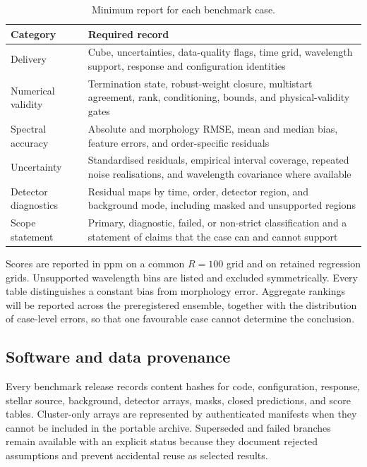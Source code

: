 \begin{table}[t]
 \centering
 \footnotesize
 \caption{Minimum report for each benchmark case.}
 \label{tab:benchmark-report}
 \setlength{\tabcolsep}{3pt}
 \begin{tabularx}{0.94\columnwidth}{@{}>{\raggedright\arraybackslash}p{}>{\raggedright\arraybackslash}X@{}}
  \toprule
  Category & Required record \\
  \midrule
  Delivery & Cube, uncertainties, data-quality flags, time grid, wavelength
  support, response and configuration identities \\
  Numerical validity & Termination state, robust-weight closure, multistart
  agreement, rank, conditioning, bounds, and physical-validity gates \\
  Spectral accuracy & Absolute and morphology RMSE, mean and median bias,
  feature errors, and order-specific residuals \\
  Uncertainty & Standardised residuals, empirical interval coverage, repeated
  noise realisations, and wavelength covariance where available \\
  Detector diagnostics & Residual maps by time, order, detector region, and
  background mode, including masked and unsupported regions \\
  Scope statement & Primary, diagnostic, failed, or non-strict classification
  and a statement of claims that the case can and cannot support \\
  \bottomrule
 \end{tabularx}
\end{table}

Scores are reported in ppm on a common $R=100$ grid and on retained regression
grids. Unsupported wavelength bins are listed and excluded symmetrically. Every
table distinguishes a constant bias from morphology error. Aggregate rankings
will be reported across the preregistered ensemble, together with the distribution
of case-level errors, so that one favourable case cannot determine the conclusion.

\subsection{Software and data provenance}

Every benchmark release records content hashes for code, configuration, response,
stellar source, background, detector arrays, masks, closed predictions, and score
tables. Cluster-only arrays are represented by authenticated manifests when they
cannot be included in the portable archive. Superseded and failed branches remain
available with an explicit status because they document rejected assumptions and
prevent accidental reuse as selected results.
